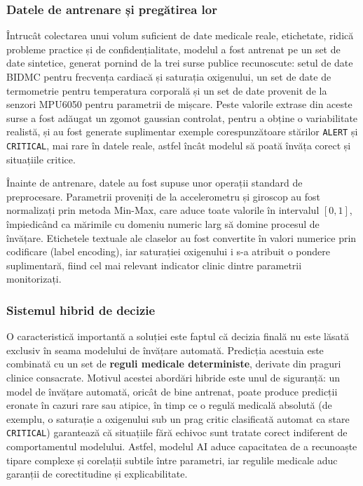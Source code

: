 ﻿\documentclass[12pt,a4paper,twoside]{article}
\begin{document}
\subsubsection{Datele de antrenare și pregătirea lor}

Întrucât colectarea unui volum suficient de date medicale reale, etichetate, ridică probleme practice și de confidențialitate, modelul a fost antrenat pe un set de date sintetice, generat pornind de la trei surse publice recunoscute: setul de date BIDMC pentru frecvența cardiacă și saturația oxigenului, un set de date de termometrie pentru temperatura corporală și un set de date provenit de la senzori MPU6050 pentru parametrii de mișcare. Peste valorile extrase din aceste surse a fost adăugat un zgomot gaussian controlat, pentru a obține o variabilitate realistă, și au fost generate suplimentar exemple corespunzătoare stărilor \texttt{ALERT} și \texttt{CRITICAL}, mai rare în datele reale, astfel încât modelul să poată învăța corect și situațiile critice.

Înainte de antrenare, datele au fost supuse unor operații standard de preprocesare. Parametrii proveniți de la accelerometru și giroscop au fost normalizați prin metoda Min-Max, care aduce toate valorile în intervalul $[0, 1]$, împiedicând ca mărimile cu domeniu numeric larg să domine procesul de învățare. Etichetele textuale ale claselor au fost convertite în valori numerice prin codificare (label encoding), iar saturației oxigenului i s-a atribuit o pondere suplimentară, fiind cel mai relevant indicator clinic dintre parametrii monitorizați.

\subsubsection{Sistemul hibrid de decizie}

O caracteristică importantă a soluției este faptul că decizia finală nu este lăsată exclusiv în seama modelului de învățare automată. Predicția acestuia este combinată cu un set de \textbf{reguli medicale deterministe}, derivate din praguri clinice consacrate. Motivul acestei abordări hibride este unul de siguranță: un model de învățare automată, oricât de bine antrenat, poate produce predicții eronate în cazuri rare sau atipice, în timp ce o regulă medicală absolută (de exemplu, o saturație a oxigenului sub un prag critic clasificată automat ca stare \texttt{CRITICAL}) garantează că situațiile fără echivoc sunt tratate corect indiferent de comportamentul modelului. Astfel, modelul AI aduce capacitatea de a recunoaște tipare complexe și corelații subtile între parametri, iar regulile medicale aduc garanții de corectitudine și explicabilitate.
\end{document}
